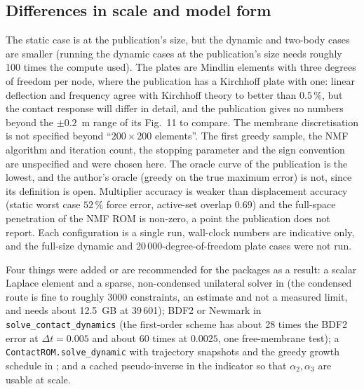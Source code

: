 \subsection*{Differences in scale and model form}

The static case is at the publication's size, but the dynamic and two-body cases are smaller (running the dynamic cases at the publication's size needs roughly 100 times the compute used). The plates are Mindlin elements with three degrees of freedom per node, where the publication has a Kirchhoff plate with one: linear deflection and frequency agree with Kirchhoff theory to better than $0.5\,\%$, but the contact response will differ in detail, and the publication gives no numbers beyond the $\pm0.2$~m range of its Fig.~11 to compare. The membrane discretisation is not specified beyond ``$200\times200$ elements''. The first greedy sample, the NMF algorithm and iteration count, the stopping parameter and the sign convention are unspecified and were chosen here. The oracle curve of the publication is the lowest, and the author's oracle (greedy on the true maximum error) is not, since its definition is open. Multiplier accuracy is weaker than displacement accuracy (static worst case $52\,\%$ force error, active-set overlap $0.69$) and the full-space penetration of the NMF ROM is non-zero, a point the publication does not report. Each configuration is a single run, wall-clock numbers are indicative only, and the full-size dynamic and 20\,000-degree-of-freedom plate cases were not run.

Four things were added or are recommended for the packages as a result: a scalar Laplace element and a sparse, non-condensed unilateral solver in \fea{} (the condensed route is fine to roughly 3000 constraints, an estimate and not a measured limit, and needs about 12.5~GB at 39\,601); BDF2 or Newmark in \texttt{solve\_contact\_dynamics} (the first-order scheme has about 28 times the BDF2 error at $\Delta t=0.005$ and about 60 times at $0.0025$, one free-membrane test); a \texttt{ContactROM.solve\_dynamic} with trajectory snapshots and the greedy growth schedule in \rom{}; and a cached pseudo-inverse in the indicator so that $\alpha_2,\alpha_3$ are usable at scale.
